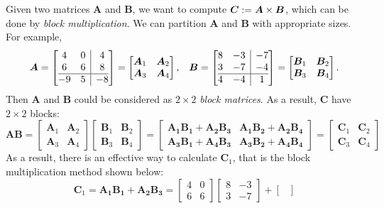 \begin{enumerate}
\begin{example}
Given two matrices $\bm A$ and $\bm B$, we want to compute $\bm C:=\bm A\times\bm B$, which can be done by \emph{block multiplication}. We can partition $\bm A$ and $\bm B$ with appropriate sizes. For example, 
\[\begin{array}{ll}
\bm A=\left[
\begin{array}{@{}cc|c@{}}
4&0&4\\
6&6&8\\
\hline
-9&5&-8
\end{array}
\right]
=\begin{bmatrix}
\bm A_1&\bm A_2\\\bm A_3&\bm A_4
\end{bmatrix},
&
\bm B=\left[
\begin{array}{@{}cc|c@{}}
8&-3&-7\\
3&-7&-4\\
\hline
4&-4&1
\end{array}
\right]=\begin{bmatrix}
\bm B_1&\bm B_2\\\bm B_3&\bm B_4
\end{bmatrix}.
\end{array}
\]
Then $\bm A$ and $\bm B$ could be considered as $2\times 2$ \emph{block matrices}. As a result, $\bm C$ have $2\times 2$ blocks:
\[
\bm{AB}=\begin{bmatrix}
\bm A_1&\bm A_2\\\bm A_3&\bm A_4
\end{bmatrix}\begin{bmatrix}
\bm B_1&\bm B_2\\\bm B_3&\bm B_4
\end{bmatrix}=\begin{bmatrix}
\bm{A_1B_1}+\bm{A_2B_3}&\bm{A_1B_2}+\bm{A_2B_4}\\\bm{A_3B_1}+\bm{A_4B_3}&\bm{A_3B_2}+\bm{A_4B_4}
\end{bmatrix}
=\begin{bmatrix}
\bm C_1&\bm C_2\\\bm C_3&\bm C_4
\end{bmatrix}
\]
As a result, there is an effective way to calculate $\bm C_1$, that is the block multiplication method
shown below:
\[
\bm C_1=\bm{A_1B_1}+\bm{A_2B_3}
=\begin{bmatrix}
4&0\\6&6
\end{bmatrix}\begin{bmatrix}
8&-3\\3&-7
\end{bmatrix}+\begin{bmatrix}

\end{bmatrix}\]
\end{example}
\end{enumerate}

